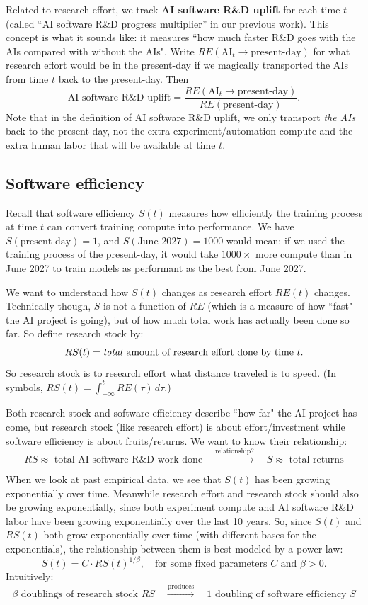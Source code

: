 \documentclass{article}
\theoremstyle{definition}
\begin{document}
Related to research effort, we track \textbf{AI software R\&D uplift} for each time $t$ (called ``AI software R\&D progress multiplier” in our previous work). This concept is what it sounds like: it measures ``how much faster R\&D goes with the AIs compared with without the AIs". Write $RE(\text{AI}_t \rightarrow \text{present-day})$ for what research effort would be in the present-day if we magically transported the AIs from time $t$ back to the present-day. Then
\[ \text{AI software R\&D uplift} = \frac{RE(\text{AI}_t \rightarrow \text{present-day})}{RE(\text{present-day})}.\]
Note that in the definition of AI software R\&D uplift, we only transport \textit{the AIs} back to the present-day, not the extra experiment/automation compute and the extra human labor that will be available at time $t$.

\subsection{Software efficiency} \label{Software efficiency}

Recall that software efficiency $S(t)$ measures how efficiently the training process at time $t$ can convert training compute into performance. We have $S(\text{present-day}) = 1$, and $S(\text{June 2027}) = 1000$ would mean: if we used the training process of the present-day, it would take $1000 \times$ more compute than in June 2027 to train models as performant as the best from June 2027.

We want to understand how $S(t)$ changes as research effort $RE(t)$ changes. Technically though, $S$ is not a function of $RE$ (which is a measure of how ``fast" the AI project is going), but of how much total work has actually been done so far. So define research stock by:
\[ RS(t) = \text{\textit{total} amount of research effort done by time $t$}.\]
So research stock is to research effort what distance traveled is to speed. (In symbols, $RS(t) = \int_{-\infty}^t RE(\tau) \, d\tau$.)

Both research stock and software efficiency describe ``how far" the AI project has come, but research stock (like research effort) is about effort/investment while software efficiency is about fruits/returns. We want to know their relationship:
\[ \text{$RS \approx$ total AI software R\&D work done} \quad \xrightarrow{\text{relationship?}} \quad \text{$S \approx$ total returns}\]

When we look at past empirical data, we see that $S(t)$ has been growing exponentially over time. Meanwhile research effort and research stock should also be growing exponentially, since both experiment compute and AI software R\&D labor have been growing exponentially over the last 10 years. So, since $S(t)$ and $RS(t)$ both grow exponentially over time (with different bases for the exponentials), the relationship between them is best modeled by a power law: 
\[ S(t) = C \cdot RS(t)^{1/\beta}, \quad \text{for some fixed parameters $C$ and $\beta > 0$}.\]
Intuitively:
\[ \text{$\beta$ doublings of research stock $RS$} \quad \xrightarrow{\text{produces}} \quad \text{1 doubling of software efficiency $S$}\]
\end{document}
